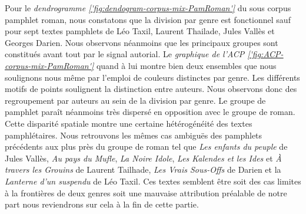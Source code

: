 \par
Pour le \textit{dendrogramme \ref{'fig:dendogram-corpus-mix-PamRoman'}} du sous corpus pamphlet roman, nous constatons que la division par genre est fonctionnel sauf pour sept textes pamphlets de Léo Taxil, Laurent Thailade, Jules Vallès et Georges Darien. Nous observons néanmoins que les principaux groupes sont constitués avant tout par le signal autorial. 
Le \textit{graphique de l'ACP \ref{'fig:ACP-corpus-mix-PamRoman'}} quand à lui montre bien deux ensembles que nous soulignons nous même par l'emploi de couleurs distinctes par genre. Les différents motifs de points soulignent la distinction entre auteurs. Nous observons donc des regroupement par auteurs au sein de la division par genre. Le groupe de pamphlet paraît néanmoins très dispersé en opposition avec le groupe de roman. Cette disparité spatiale montre une certaine hétérogénéité des textes pamphlétaires. Nous retrouvons les mêmes cas ambiguës des pamphlets précédents aux plus près du groupe de roman tel que \textit{Les enfants du peuple} de Jules Vallès, \textit{Au pays du Mufle}, \textit{La Noire Idole}, \textit{Les Kalendes et les Ides} et \textit{À travers les Grouins} de Laurent Tailhade, \textit{Les Vrais Sous-Offs} de Darien et la \textit{Lanterne d'un suspendu} de Léo Taxil. Ces textes semblent être soit des cas limites à la frontières de deux genres soit une mauvaise attribution préalable de notre part nous reviendrons sur cela à la fin de cette partie.

